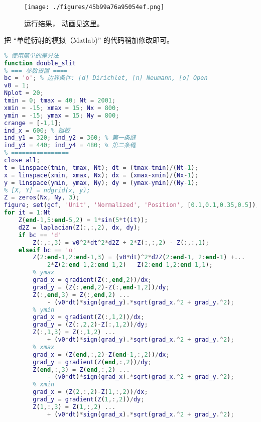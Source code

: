 
\begin{issues}
\issueDraft
\end{issues}


\begin{figure}[ht]
\centering
\texttt{[image: ./figures/45b99a76a95054ef.png]}
\caption{运行结果， 动画见\href{https://wuli.wiki/apps/db_slit.html}{这里}。} \label{fig_DbSliN_1}
\end{figure}

把 “单缝衍射的模拟（Matlab)” 的代码稍加修改即可。
\begin{lstlisting}[language=matlab, caption=double\_slit.m]
% 双缝干涉的模拟
% 使用简单的差分法
function double_slit
% === 参数设置 ====
bc = 'o'; % 边界条件: [d] Dirichlet, [n] Neumann, [o] Open
v0 = 1;
Nplot = 20;
tmin = 0; tmax = 40; Nt = 2001;
xmin = -15; xmax = 15; Nx = 800;
ymin = -15; ymax = 15; Ny = 800;
crange = [-1,1];
ind_x = 600; % 挡板
ind_y1 = 320; ind_y2 = 360; % 第一条缝
ind_y3 = 440; ind_y4 = 480; % 第二条缝
% ================
close all;
t = linspace(tmin, tmax, Nt); dt = (tmax-tmin)/(Nt-1);
x = linspace(xmin, xmax, Nx); dx = (xmax-xmin)/(Nx-1);
y = linspace(ymin, ymax, Ny); dy = (ymax-ymin)/(Ny-1);
% [X, Y] = ndgrid(x, y);
Z = zeros(Nx, Ny, 3);
figure; set(gcf, 'Unit', 'Normalized', 'Position', [0.1,0.1,0.35,0.5]);
for it = 1:Nt
    Z(end-1,5:end-5,2) = 1*sin(5*t(it));
    d2Z = laplacian(Z(:,:,2), dx, dy);
    if bc == 'd'
        Z(:,:,3) = v0^2*dt^2*d2Z + 2*Z(:,:,2) - Z(:,:,1);
    elseif bc == 'o'
        Z(2:end-1,2:end-1,3) = (v0*dt)^2*d2Z(2:end-1, 2:end-1) +...
            2*Z(2:end-1,2:end-1,2) - Z(2:end-1,2:end-1,1);
        % ymax
        grad_x = gradient(Z(:,end,2))/dx;
        grad_y = (Z(:,end,2)-Z(:,end-1,2))/dy;
        Z(:,end,3) = Z(:,end,2) ...
            - (v0*dt)*sign(grad_y).*sqrt(grad_x.^2 + grad_y.^2);
        % ymin
        grad_x = gradient(Z(:,1,2))/dx;
        grad_y = (Z(:,2,2)-Z(:,1,2))/dy;
        Z(:,1,3) = Z(:,1,2) ...
            + (v0*dt)*sign(grad_y).*sqrt(grad_x.^2 + grad_y.^2);
        % xmax
        grad_x = (Z(end,:,2)-Z(end-1,:,2))/dx;
        grad_y = gradient(Z(end,:,2))/dy;
        Z(end,:,3) = Z(end,:,2) ...
            - (v0*dt)*sign(grad_x).*sqrt(grad_x.^2 + grad_y.^2);
        % xmin
        grad_x = (Z(2,:,2)-Z(1,:,2))/dx;
        grad_y = gradient(Z(1,:,2))/dy;
        Z(1,:,3) = Z(1,:,2) ...
            + (v0*dt)*sign(grad_x).*sqrt(grad_x.^2 + grad_y.^2);

\end{lstlisting}
